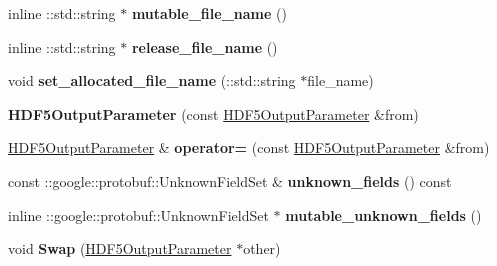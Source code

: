 \begin{DoxyCompactItemize}
inline \+::std\+::string $\ast$ {\bfseries mutable\+\_\+file\+\_\+name} ()
\item 
\mbox{\label{classcaffe_1_1_h_d_f5_output_parameter_ab1e2d6873bc6071174018f776437c847}} 
inline \+::std\+::string $\ast$ {\bfseries release\+\_\+file\+\_\+name} ()
\item 
\mbox{\label{classcaffe_1_1_h_d_f5_output_parameter_ab2e36acb96886b0f511d91b155186c57}} 
void {\bfseries set\+\_\+allocated\+\_\+file\+\_\+name} (\+::std\+::string $\ast$file\+\_\+name)
\item 
\mbox{\label{classcaffe_1_1_h_d_f5_output_parameter_a0af90c542a7dce28b533fc4b2cba9aba}} 
{\bfseries H\+D\+F5\+Output\+Parameter} (const \mbox{\hyperlink{classcaffe_1_1_h_d_f5_output_parameter}{H\+D\+F5\+Output\+Parameter}} \&from)
\item 
\mbox{\label{classcaffe_1_1_h_d_f5_output_parameter_a1ea21af01a48be2cbd506b4dc7128396}} 
\mbox{\hyperlink{classcaffe_1_1_h_d_f5_output_parameter}{H\+D\+F5\+Output\+Parameter}} \& {\bfseries operator=} (const \mbox{\hyperlink{classcaffe_1_1_h_d_f5_output_parameter}{H\+D\+F5\+Output\+Parameter}} \&from)
\item 
\mbox{\label{classcaffe_1_1_h_d_f5_output_parameter_a99f44fadf75119df4eb30f61a6f1511f}} 
const \+::google\+::protobuf\+::\+Unknown\+Field\+Set \& {\bfseries unknown\+\_\+fields} () const
\item 
\mbox{\label{classcaffe_1_1_h_d_f5_output_parameter_a32460cf98a8be171c31f93c4a822a17a}} 
inline \+::google\+::protobuf\+::\+Unknown\+Field\+Set $\ast$ {\bfseries mutable\+\_\+unknown\+\_\+fields} ()
\item 
\mbox{\label{classcaffe_1_1_h_d_f5_output_parameter_acb46004129812ea27e90a42a7e90612f}} 
void {\bfseries Swap} (\mbox{\hyperlink{classcaffe_1_1_h_d_f5_output_parameter}{H\+D\+F5\+Output\+Parameter}} $\ast$other)
\item 
\mbox{\label{classcaffe_1_1_h_d_f5_output_parameter_a61dec6298531b267155906145d5206fa}} 

\end{DoxyCompactItemize}
